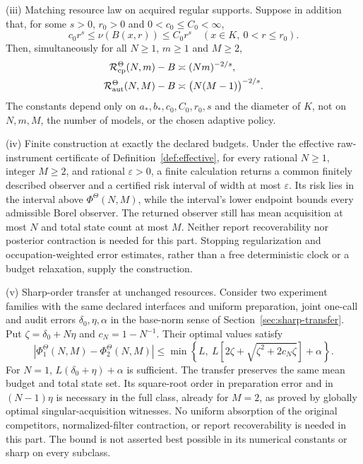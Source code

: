 \begin{theorem}
\smallskip\noindent\textup{(iii) Matching resource law on acquired regular supports.}
Suppose in addition that, for some $s>0$, $r_0>0$ and $0<c_0\le C_0<\infty$,
\begin{equation}\label{eq:regularity}
 c_0r^s\le\nu(B(x,r))\le C_0r^s
 \quad(x\in K,\ 0<r\le r_0).
\end{equation}
Then, simultaneously for all $N\ge1$, $m\ge1$ and $M\ge2$,
\begin{align}
 \mathcal R_{\mathrm{cp}}^\Theta(N,m)-B&\asymp (Nm)^{-2/s},\label{eq:regular-cp}\\
 \mathcal R_{\mathrm{aut}}^\Theta(N,M)-B&\asymp \bigl(N(M-1)\bigr)^{-2/s}.\label{eq:regular-aut}
\end{align}
The constants depend only on $a_*,b_*,c_0,C_0,r_0,s$ and the diameter of $K$, not on $N,m,M$, the number of models, or the chosen adaptive policy.

\smallskip\noindent\textup{(iv) Finite construction at exactly the declared budgets.}
Under the effective raw-instrument certificate of Definition~\ref{def:effective}, for every rational $N\ge1$, integer $M\ge2$, and rational $\varepsilon>0$, a finite calculation returns a common finitely described observer and a certified risk interval of width at most $\varepsilon$. Its risk lies in the interval above $\Phi^\Theta(N,M)$, while the interval's lower endpoint bounds every admissible Borel observer. The returned observer still has mean acquisition at most $N$ and total state count at most $M$. Neither report recoverability nor posterior contraction is needed for this part. Stopping regularization and occupation-weighted error estimates, rather than a free deterministic clock or a budget relaxation, supply the construction.

\smallskip\noindent\textup{(v) Sharp-order transfer at unchanged resources.}
Consider two experiment families with the same declared interfaces and uniform preparation, joint one-call and audit errors $\delta_0,\eta,\alpha$ in the base-norm sense of Section~\ref{sec:sharp-transfer}. Put $\zeta=\delta_0+N\eta$ and $c_N=1-N^{-1}$. Their optimal values satisfy
\begin{equation}\label{eq:central-normalized}
 |\Phi_1^\Theta(N,M)-\Phi_2^\Theta(N,M)|
 \le\min\left\{L,\ L\left[2\zeta+\sqrt{\zeta^2+2c_N\zeta}\right]+\alpha\right\}.
\end{equation}
For $N=1$, $L(\delta_0+\eta)+\alpha$ is sufficient. The transfer preserves the same mean budget and total state set. Its square-root order in preparation error and in $(N-1)\eta$ is necessary in the full class, already for $M=2$, as proved by globally optimal singular-acquisition witnesses. No uniform absorption of the original competitors, normalized-filter contraction, or report recoverability is needed in this part. The bound is not asserted best possible in its numerical constants or sharp on every subclass.
\end{theorem}

